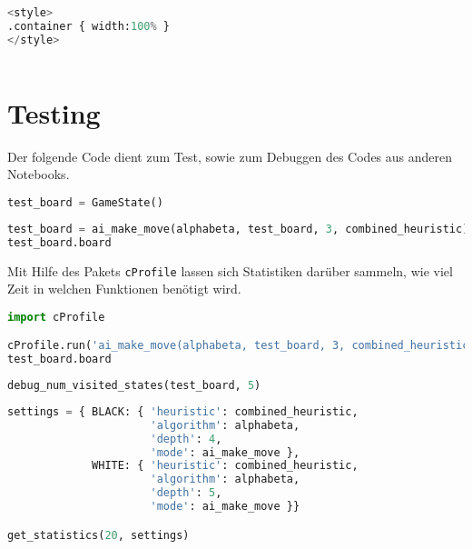 \begin{lstlisting}[language=Python]
%%HTML
<style>
.container { width:100% }
</style>
\end{lstlisting}

\begin{lstlisting}[language=Python]
%run othello_test_util.ipynb
\end{lstlisting}

\hypertarget{testing}{%
\section{Testing}\label{testing}}

Der folgende Code dient zum Test, sowie zum Debuggen des Codes aus
anderen Notebooks.

\begin{lstlisting}[language=Python]
test_board = GameState()
\end{lstlisting}

\begin{lstlisting}[language=Python]
test_board = ai_make_move(alphabeta, test_board, 3, combined_heuristic)
test_board.board
\end{lstlisting}

Mit Hilfe des Pakets \passthrough{\lstinline!cProfile!} lassen sich
Statistiken darüber sammeln, wie viel Zeit in welchen Funktionen
benötigt wird.

\begin{lstlisting}[language=Python]
import cProfile

cProfile.run('ai_make_move(alphabeta, test_board, 3, combined_heuristic)')
test_board.board
\end{lstlisting}

\begin{lstlisting}[language=Python]
debug_num_visited_states(test_board, 5)
\end{lstlisting}

\begin{lstlisting}[language=Python]
settings = { BLACK: { 'heuristic': combined_heuristic,
                      'algorithm': alphabeta,
                      'depth': 4,
                      'mode': ai_make_move },
             WHITE: { 'heuristic': combined_heuristic,
                      'algorithm': alphabeta,
                      'depth': 5,
                      'mode': ai_make_move }}

get_statistics(20, settings)
\end{lstlisting}

